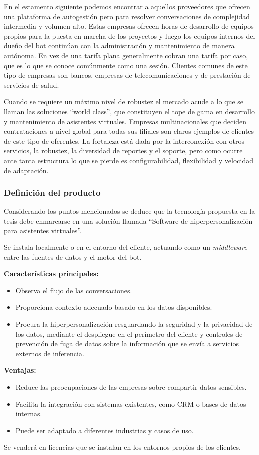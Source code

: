 En el estamento siguiente podemos encontrar a aquellos proveedores que ofrecen una plataforma de autogestión pero para resolver conversaciones de complejidad intermedia y volumen alto. Estas empresas ofrecen horas de desarrollo de equipos propios para la puesta en marcha de los proyectos y luego los equipos internos del dueño del bot continúan con la administración y mantenimiento de manera autónoma. En vez de una tarifa plana generalmente cobran una tarifa por caso, que es lo que se conoce comúnmente como una sesión. Clientes comunes de este tipo de empresas son bancos, empresas de telecomunicaciones y de prestación de servicios de salud.

Cuando se requiere un máximo nivel de robustez el mercado acude a lo que se llaman las soluciones ``world class'', que constituyen el tope de gama en desarrollo y mantenimiento de asistentes virtuales. Empresas multinacionales que deciden contrataciones a nivel global para todas sus filiales son claros ejemplos de clientes de este tipo de oferentes. La fortaleza está dada por la interconexión con otros servicios, la robustez, la diversidad de reportes y el soporte, pero como ocurre ante tanta estructura lo que se pierde es configurabilidad, flexibilidad y velocidad de adaptación.

\subsubsection{Definición del producto}

Considerando los puntos mencionados se deduce que la tecnología propuesta en la tesis debe enmarcarse en una solución llamada ``Software de hiperpersonalización para asistentes virtuales''.

Se instala localmente o en el entorno del cliente, actuando como un \textit{middleware} entre las fuentes de datos y el motor del bot.

\textbf{Características principales:}
\begin{itemize}
    \item Observa el flujo de las conversaciones.
    \item Proporciona contexto adecuado basado en los datos disponibles.
    \item Procura la hiperpersonalización resguardando la seguridad y la privacidad de los datos, mediante el despliegue en el perímetro del cliente y controles de prevención de fuga de datos sobre la información que se envía a servicios externos de inferencia.
\end{itemize}

\textbf{Ventajas:}
\begin{itemize}
    \item Reduce las preocupaciones de las empresas sobre compartir datos sensibles.
    \item Facilita la integración con sistemas existentes, como CRM o bases de datos internas.
    \item Puede ser adaptado a diferentes industrias y casos de uso.
\end{itemize}

Se venderá en licencias que se instalan en los entornos propios de los clientes. 